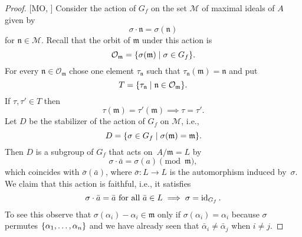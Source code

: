 \begin{proof} {[MO, \citeauthor{386280}]}
    Consider the action of $G_f$ on the set $\mathcal M$ of maximal ideals of $A$ given by 
    $$
        \sigma\cdot\mathfrak n=\sigma(\mathfrak n)
    $$
    for $\mathfrak n\in\mathcal M$. Recall that the orbit of $\mathfrak m$ under this action is
    $$
        \mathcal O_{\mathfrak m}
            =\{\sigma(\mathfrak m)\mid\sigma\in G_f\}.
    $$
    For every $\mathfrak n\in\mathcal O_{\mathfrak m}$ chose one element $\tau_{\mathfrak n}$ such that
    $\tau_{\mathfrak n}(\mathfrak m)=\mathfrak n$ and put
    $$
        T = \{\tau_{\mathfrak n}\mid
            \mathfrak n\in\mathcal O_{\mathfrak m}\}.
    $$
    If $\tau,\tau'\in T$ then
    \begin{equation}\label{eq:T-uniqueness}
        \tau(\mathfrak m)=\tau'(\mathfrak m)\implies\tau=\tau'.
    \end{equation}
    Let $D$ be the stabilizer of the action of $G_f$ on $\mathcal M$, i.e.,
    $$
        D = \{\sigma\in G_f
            \mid \sigma(\mathfrak m)=\mathfrak m\}.
    $$
    Then $D$ is a subgroup of $G_f$ that acts on~$A/\mathfrak m=L$ by
    $$
        \sigma\cdot\bar a=\sigma(a)\pmod{\mathfrak m},
    $$
    which coincides with $\bar\sigma(\bar a)$, where $\bar\sigma\colon L\to L$ is the automorphism induced by~$\sigma$. We claim that this action is faithful, i.e., it satisfies
    \begin{equation}\label{eq:faithful-bar}
        \sigma\cdot\bar a=\bar a\text{ for all }\bar a\in L
            \implies\sigma=\operatorname{id}_{G_f}.
    \end{equation}
    To see this observe that $\sigma(\alpha_i)-\alpha_i\in\mathfrak m$ only if $\sigma(\alpha_i)=\alpha_i$ because $\sigma$ permutes $\{\alpha_1,\dots,\alpha_n\}$ and we have already seen that $\bar\alpha_i\ne\bar\alpha_j$ when $i\ne j$.


\end{proof}
